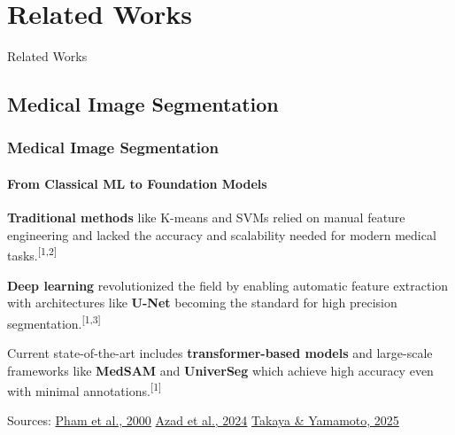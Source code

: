 \documentclass[nometaot,lecture,amberg,toc=twocolumn,indicatelastpageofframe,footlinebox]{OTHAWbeamer}
\begin{document}

\section{Related Works}
\begin{breakframe}
    Related Works
\end{breakframe}


\subsection{Medical Image Segmentation}
\begin{frame}[label=relworks1]
    \frametitle{Medical Image Segmentation}
    \framesubtitle{From Classical ML to Foundation Models}

    \textcolor{orange1}{\textbf{Traditional methods}} like K-means and SVMs
    relied on manual feature engineering and lacked the accuracy and
    scalability needed for modern medical tasks.\textsuperscript{[1,2]}

    \vspace{0.7em}

    \textcolor{orange1}{\textbf{Deep learning}} revolutionized the field by
    enabling automatic feature extraction with architectures like
    \textbf{U-Net} becoming the standard for high precision
    segmentation.\textsuperscript{[1,3]}

    \vspace{0.7em}

    Current state-of-the-art includes \textcolor{orange1}{\textbf{transformer-based
    models}} and large-scale frameworks like \textbf{MedSAM} and
    \textbf{UniverSeg} which achieve high accuracy even with
    minimal annotations.\textsuperscript{[1]}

    \vspace{0.3em}
    {\tiny\textcolor{grau2}{Sources: \href{https://pubmed.ncbi.nlm.nih.gov/11701515/}{Pham et al., 2000} \quad \href{https://ieeexplore.ieee.org/document/10643318}{Azad et al., 2024} \quad \href{https://arxiv.org/abs/2412.13299}{Takaya \& Yamamoto, 2025}}}

\end{frame}
\end{document}
